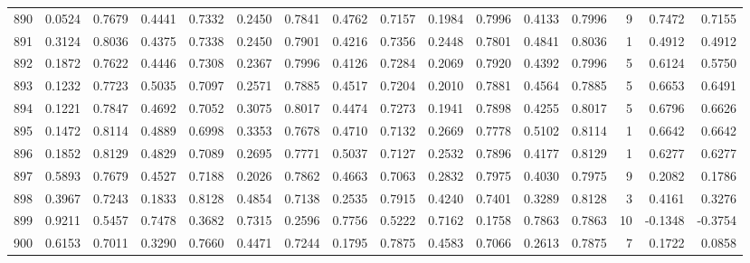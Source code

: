 \begin{tabular}{lrrrrrrrrrrrrrrr}
890 &      0.0524 &  0.7679 &  0.4441 &  0.7332 &  0.2450 &  0.7841 &  0.4762 &  0.7157 &  0.1984 &  0.7996 &   0.4133 &     0.7996 &      9 &                    0.7472 &                     0.7155 \\
891 &      0.3124 &  0.8036 &  0.4375 &  0.7338 &  0.2450 &  0.7901 &  0.4216 &  0.7356 &  0.2448 &  0.7801 &   0.4841 &     0.8036 &      1 &                    0.4912 &                     0.4912 \\
892 &      0.1872 &  0.7622 &  0.4446 &  0.7308 &  0.2367 &  0.7996 &  0.4126 &  0.7284 &  0.2069 &  0.7920 &   0.4392 &     0.7996 &      5 &                    0.6124 &                     0.5750 \\
893 &      0.1232 &  0.7723 &  0.5035 &  0.7097 &  0.2571 &  0.7885 &  0.4517 &  0.7204 &  0.2010 &  0.7881 &   0.4564 &     0.7885 &      5 &                    0.6653 &                     0.6491 \\
894 &      0.1221 &  0.7847 &  0.4692 &  0.7052 &  0.3075 &  0.8017 &  0.4474 &  0.7273 &  0.1941 &  0.7898 &   0.4255 &     0.8017 &      5 &                    0.6796 &                     0.6626 \\
895 &      0.1472 &  0.8114 &  0.4889 &  0.6998 &  0.3353 &  0.7678 &  0.4710 &  0.7132 &  0.2669 &  0.7778 &   0.5102 &     0.8114 &      1 &                    0.6642 &                     0.6642 \\
896 &      0.1852 &  0.8129 &  0.4829 &  0.7089 &  0.2695 &  0.7771 &  0.5037 &  0.7127 &  0.2532 &  0.7896 &   0.4177 &     0.8129 &      1 &                    0.6277 &                     0.6277 \\
897 &      0.5893 &  0.7679 &  0.4527 &  0.7188 &  0.2026 &  0.7862 &  0.4663 &  0.7063 &  0.2832 &  0.7975 &   0.4030 &     0.7975 &      9 &                    0.2082 &                     0.1786 \\
898 &      0.3967 &  0.7243 &  0.1833 &  0.8128 &  0.4854 &  0.7138 &  0.2535 &  0.7915 &  0.4240 &  0.7401 &   0.3289 &     0.8128 &      3 &                    0.4161 &                     0.3276 \\
899 &      0.9211 &  0.5457 &  0.7478 &  0.3682 &  0.7315 &  0.2596 &  0.7756 &  0.5222 &  0.7162 &  0.1758 &   0.7863 &     0.7863 &     10 &                   -0.1348 &                    -0.3754 \\
900 &      0.6153 &  0.7011 &  0.3290 &  0.7660 &  0.4471 &  0.7244 &  0.1795 &  0.7875 &  0.4583 &  0.7066 &   0.2613 &     0.7875 &      7 &                    0.1722 &                     0.0858 \\

\end{tabular}

